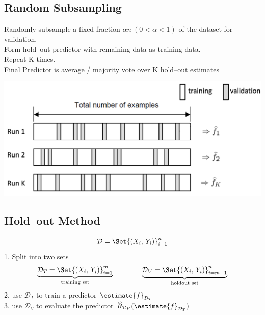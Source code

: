 \documentclass[18pt,a3paper,landscape, ncols=3]{cheatsheet}
\begin{document}
		\subsection{Random Subsampling}
			\begin{mdframed}
				\begin{minipage}{.5\textwidth}
					Randomly subsample a fixed fraction \(\alpha n\ (0 < \alpha < 1)\) of the dataset for validation.\\
					Form hold--out predictor with remaining data as training data.\\
					Repeat K times.\\
					Final Predictor is average / majority vote over K hold--out estimates
				\end{minipage}%
				\begin{minipage}{.5\textwidth}
					\includegraphics{random_subsampling.png}
				\end{minipage}
			\end{mdframed}
		\subsection{Hold--out Method}
			\begin{mdframed}
				\[
					\mathcal{D} = \Set{(X_i,\, Y_i)}_{i=1}^{n}
				\]
				1. Split into two sets
				\[
					\underbrace{\mathcal{D}_{T} = \Set{(X_i,\, Y_i)}_{i=1}^{m}}_{\text{training set}}
					\qquad\qquad
					\underbrace{\mathcal{D}_{V} = \Set{(X_i,\, Y_i)}_{i=m+1}^{n}}_{\text{holdout set}}
				\]
				2. use \(\mathcal{D}_{T}\) to train a predictor \(\estimate{f}_{\mathcal{D}_{T}}\)\\
				3. use \(\mathcal{D}_{V}\) to evaluate the predictor \(\widehat{R}_{\mathcal{D}_{V}}(\estimate{f}_{\mathcal{D}_{T}})\)
			\end{mdframed}
\end{document}
